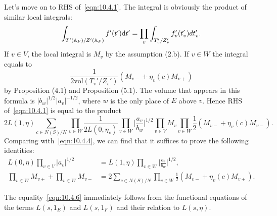 Let's move on to RHS of~\eqref{eqn:10.4.1}.
The integral is obviously the product of similar local integrals:
\begin{equation*}
    \int_{T'(\mathbb{A}_F) / Z'(\mathbb{A}_F)} f'(t')\mathrm{d} t' = \prod_{v} \int_{T_v' / Z_v'} f'_v(t_v') dt_v'.
\end{equation*}
If $v\in V$, the local integral is $M_v$ by the assumption (2.b).
If $v\in W$ the integral equals to
\begin{equation*}
    \frac{1}{2\mathrm{vol}(T_v'/Z_v')} (M_{v-} + \eta_v(c) M_{v+})
\end{equation*}
by Proposition (4.1) and Proposition (5.1).
The volume that appears in this formula is $|b_w|^{1/2}|a_v|^{-1/2}$, where $w$ is the only place of $E$ above $v$.
Hence RHS of~\eqref{eqn:10.4.1} is equal to the product
\begin{equation}
    2L(1,\eta) \sum_{c \in N(S)/N}\prod_{v\in W}\frac{1}{2L(0, \eta_v)} \prod_{v\in W} \bigg|\frac{a_v}{b_w}\bigg|^{1/2} \prod_{v\in V} M_v \prod_{v\in W} \frac{1}{2} (M_{v-} + \eta_v(c)M_{v-}).
\end{equation}
Comparing with~\eqref{eqn:10.4.4}, we can find that it suffices to prove the following identities:
\begin{align}
    L(0, \eta) \prod_{v\in V}|a_v|^{1/2} &= L(1, \eta) \prod_{v\in W} \bigg|\frac{a_v}{b_w}\bigg|^{1/2}, \label{eqn:10.4.6}\\
    \prod_{v\in W}M_{v+} + \prod_{v\in W} M_{v-} &= 2 \sum_{c \in N(S) / N} \prod_{v\in W} \frac{1}{2}(M_{v-} + \eta_v(c) M_{v+}). \label{eqn:10.4.7}
\end{align} 

The equality~\eqref{eqn:10.4.6} immediately follows from the functional equations of the terms $L(s, 1_E)$ and $L(s, 1_F)$ and their relation to $L(s, \eta)$.


